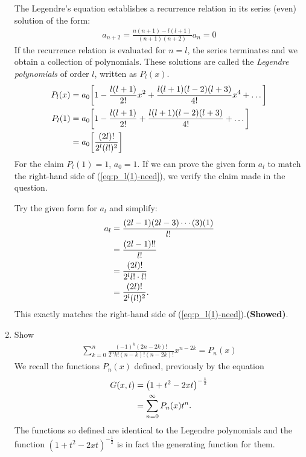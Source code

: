 \begin{enumerate}
    The Legendre's equation establishes a recurrence relation in its series (even) solution of the form:
    \begin{align}
        a_{n+2}=\frac{n(n+1)-l(l+1)}{(n+1)(n+2)}a_n=0
    \end{align}
    If the recurrence relation is evaluated for $n=l$, the series terminates and we obtain a collection of polynomials. These solutions are called the \textit{Legendre polynomials} of order $l$, written as $P_l(x)$.
    \begin{align}
        P_l(x)&=a_0\bigg[1-\frac{l(l+1)}{2!}x^2+\frac{l(l+1)(l-2)(l+3)}{4!}x^4+\ldots\bigg]\notag\\
        P_l(1)&=a_0\bigg[1-\frac{l(l+1)}{2!}+\frac{l(l+1)(l-2)(l+3)}{4!}+\ldots\bigg]\notag\\
        &=a_0\bigg[\frac{(2l)!}{2^l(l!)^2}\bigg]\label{eq:p_l(1)-need}
    \end{align}
    For the claim $P_l(1) = 1$, $a_0=1$. If we can prove the given form $a_l$ to match the right-hand side of (\ref{eq:p_l(1)-need}), we verify the claim made in the question. 
    
    Try the given form for $a_l$ and simplify:
    \begin{align}
        a_l &= \frac{(2l-1)(2l-3)\cdots(3)(1)}{l!}\notag\\
        &=\frac{(2l-1)!!}{l!}\notag\\
        &=\frac{(2l)!}{2^ll!\cdot l!}\notag\\
        &=\frac{(2l)!}{2^l(l!)^2}.
    \end{align}
    This exactly matches the right-hand side of (\ref{eq:p_l(1)-need}).\hfill\textbf{(Showed)}.
    \bigskip\bigskip\hline\hline\bigskip
    \item Show 
    \begin{align}
        \sum_{k=0}^{n} \frac{(-1)^k (2n-2k)!}{2^n k!(n-k)!(n-2k)!} x^{n-2k} = P_n(x)
    \end{align}
    \bigskip\bigskip\hline\hline\bigskip
    We recall the functions $P_n(x)$ defined, previously by the equation
    \begin{align}
        G(x,t)&=\left(1+t^2-2xt\right)^{-\frac{1}{2}}\notag\\
        &=\sum_{n=0}^\infty P_n(x)t^n.\label{eq:generating-eqn-legendre}
    \end{align}
    The functions so defined are identical to the Legendre polynomials and the function $\displaystyle \left(1+t^2-2xt\right)^{-\frac{1}{2}}$ is in fact the generating function for them.


\end{enumerate}
